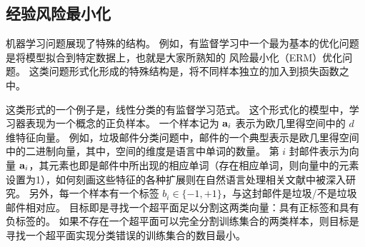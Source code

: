 \subsection{
    经验风险最小化
    }

机器学习问题展现了特殊的结构。
例如，有监督学习中一个最为基本的优化问题是将模型拟合到特定数据上，也就是大家所熟知的 风险最小化（ERM）优化问题。
这类问题形式化形成的特殊结构是，将不同样本独立的加入到损失函数之中。

这类形式的一个例子是，线性分类的有监督学习范式。
这个形式化的模型中，学习器表现为一个概念的正负样本。
一个样本记为 $\mathbf{a}_i$ 表示为欧几里得空间中的 $d$ 维特征向量。
例如，垃圾邮件分类问题中，邮件的一个典型表示是欧几里得空间中的二进制向量，其中，空间的维度是语言中单词的数量。
第 $i$ 封邮件表示为向量 $\mathbf{a}_i$，其元素也即是邮件中所出现的相应单词（存在相应单词，则向量中的元素设置为1），如何刻画这些特征的各种扩展则在自然语言处理相关文献中被深入研究。
另外，每一个样本有一个标签 $b_i \in \{-1,+1\}$，与这封邮件是垃圾/不是垃圾邮件相对应。
目标即是寻找一个超平面足以分割这两类向量：具有正标签和具有负标签的。
如果不存在一个超平面可以完全分割训练集合的两类样本，则目标是寻找一个超平面实现分类错误的训练集合的数目最小。

